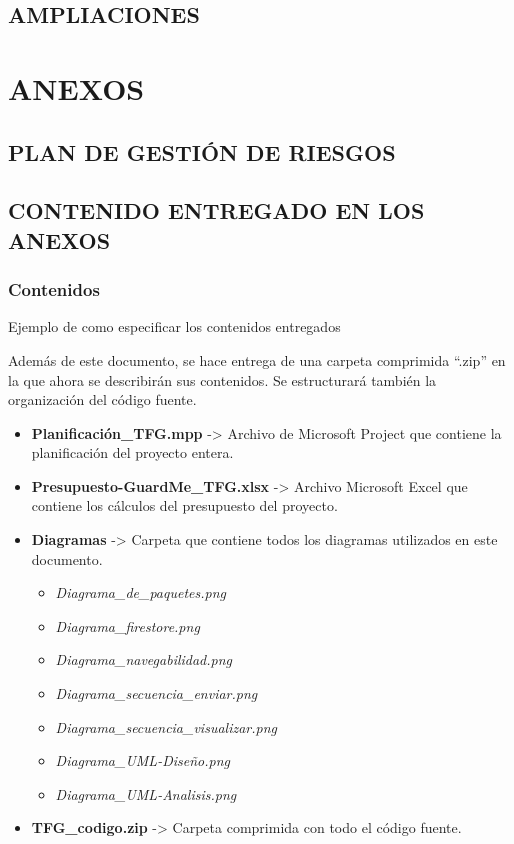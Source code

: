\documentclass[11pt]{report}
\begin{document}
\newpage
\section{AMPLIACIONES} 


\newpage
\chapter*{ANEXOS}
\newpage
{}
\section*{PLAN DE GESTIÓN DE RIESGOS}

\newpage
\section*{CONTENIDO ENTREGADO EN LOS ANEXOS} 

\subsection*{Contenidos} 

\textcolor[rgb]{0.65,0.16,0}{Ejemplo de como especificar los contenidos entregados}

Además de este documento, se hace entrega de una carpeta comprimida ``.zip'' en la que ahora se describirán sus contenidos. Se estructurará también la organización del código fuente.

\begin{itemize}
	\item \textbf{Planificación\_TFG.mpp} -> Archivo de Microsoft Project que contiene la planificación del proyecto entera.
	\item \textbf{Presupuesto-GuardMe\_TFG.xlsx} -> Archivo Microsoft Excel que contiene los cálculos del presupuesto del proyecto.
	\item \textbf{Diagramas} -> Carpeta que contiene todos los diagramas utilizados en este documento.
	\begin{itemize}
		\item \textit{Diagrama\_de\_paquetes.png}
		\item \textit{Diagrama\_firestore.png}
		\item \textit{Diagrama\_navegabilidad.png}
		\item \textit{Diagrama\_secuencia\_enviar.png}
		\item \textit{Diagrama\_secuencia\_visualizar.png}
		\item \textit{Diagrama\_UML-Diseño.png}
		\item \textit{Diagrama\_UML-Analisis.png}
	\end{itemize}
	\item \textbf{TFG\_codigo.zip} -> Carpeta comprimida con todo el código fuente.
\end{itemize}
\end{document}
